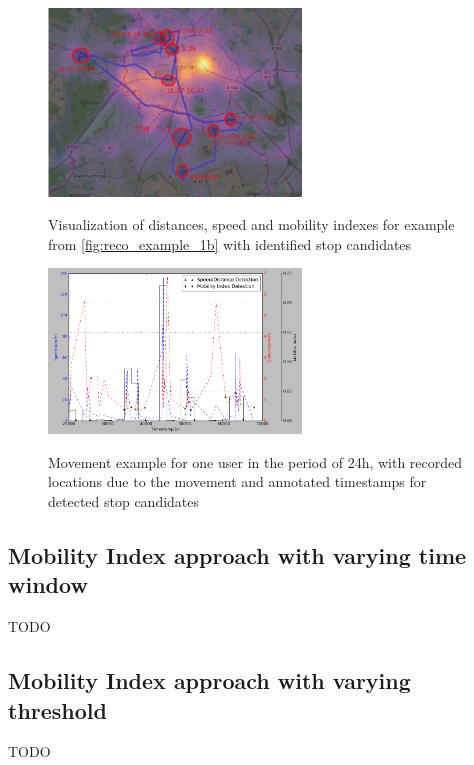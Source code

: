 \begin{figure}[!ht]
	\centering
	\includegraphics[width=0.6\textwidth]{images/reco_example_1a.png}\\
	\caption{ Visualization of distances, speed and mobility indexes for example from \autoref{fig:reco_example_1b} with identified stop candidates }
	\label{fig:reco_example_1a}
\end{figure} 
\begin{figure}[!ht]
	\centering
	\includegraphics[width=0.6\textwidth]{images/reco_example_1b.png}\\
	\caption{ Movement example for one user in the period of 24h, with recorded locations due to the movement and annotated timestamps for detected stop candidates }
	\label{fig:reco_example_1b}
\end{figure}
\FloatBarrier

\subsection{Mobility Index approach with varying time window}

TODO

\subsection{Mobility Index approach with varying threshold}

TODO

